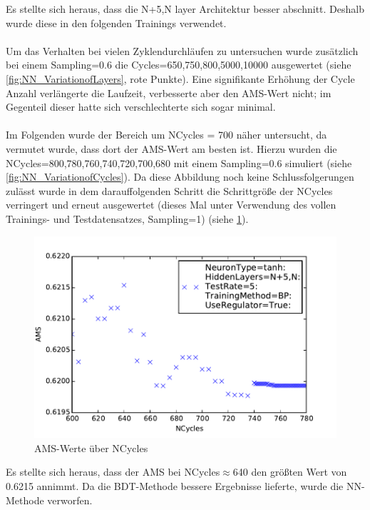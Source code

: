 \noindent Es stellte sich heraus, dass die N+5,N layer Architektur besser abschnitt. Deshalb wurde diese in den folgenden Trainings verwendet. \\ \\
Um das Verhalten bei vielen Zyklendurchläufen zu untersuchen wurde zusätzlich bei einem Sampling=0.6 die Cycles=650,750,800,5000,10000 ausgewertet (siehe \ref{fig:NN_VariationofLayers}, rote Punkte). Eine signifikante Erhöhung der Cycle Anzahl verlängerte die Laufzeit, verbesserte aber den AMS-Wert nicht; im Gegenteil dieser hatte sich  verschlechterte sich sogar minimal. \\ \\
Im Folgenden wurde der Bereich um NCycles = 700 näher untersucht, da vermutet wurde, dass dort der AMS-Wert am besten ist. Hierzu wurden die NCycles=800,780,760,740,720,700,680 mit einem Sampling=0.6 simuliert (siehe \ref{fig:NN_VariationofCycles}). Da diese Abbildung noch keine Schlussfolgerungen zulässt wurde in dem darauffolgenden Schritt die Schrittgröße der NCycles verringert und erneut ausgewertet (dieses Mal unter Verwendung des vollen Trainings- und Testdatensatzes, Sampling=1) (siehe \ref{fig:NN_Variationlowstep}). 
\begin{figure}[tb]
\centering
\includegraphics[scale=1]{sections/parameter_optimization_ANN/plot6.pdf}
\caption{AMS-Werte über NCycles}
\label{fig:NN_Variationlowstep} 
\end{figure}
Es stellte sich heraus, dass der AMS bei NCycles$\approx$640 den größten Wert von 0.6215 annimmt. Da die BDT-Methode bessere Ergebnisse lieferte, wurde die NN-Methode verworfen. \\ \\